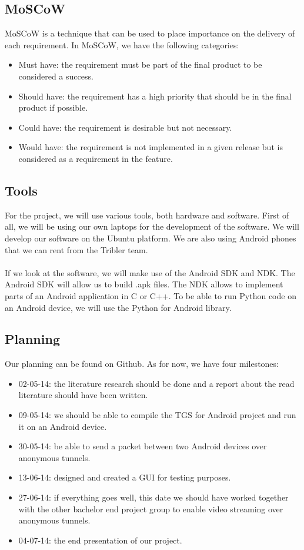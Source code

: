\documentclass{article}
\begin{document}
\subsection{MoSCoW}
MoSCoW is a technique that can be used to place importance on the delivery of each requirement. In MoSCoW, we have the following categories:
\begin{itemize}
\item Must have: the requirement must be part of the final product to be considered a success.
\item Should have: the requirement has a high priority that should be in the final product if possible.
\item Could have: the requirement is desirable but not necessary.
\item Would have: the requirement is not implemented in a given release but is considered as a requirement in the feature.
\end{itemize}

\subsection{Tools}
For the project, we will use various tools, both hardware and software. First of all, we will be using our own laptops for the development of the software. We will develop our software on the Ubuntu platform. We are also using Android phones that we can rent from the Tribler team.\\\\
If we look at the software, we will make use of the Android SDK and NDK. The Android SDK will allow us to build .apk files. The NDK allows to implement parts of an Android application in C or C++. To be able to run Python code on an Android device, we will use the Python for Android library.

\subsection{Planning}
Our planning can be found on Github. As for now, we have four milestones:
\begin{itemize}
\item 02-05-14: the literature research should be done and a report about the read literature should have been written.
\item 09-05-14: we should be able to compile the TGS for Android project and run it on an Android device.
\item 30-05-14: be able to send a packet between two Android devices over anonymous tunnels.
\item 13-06-14: designed and created a GUI for testing purposes.
\item 27-06-14: if everything goes well, this date we should have worked together with the other bachelor end project group to enable video streaming over anonymous tunnels.
\item 04-07-14: the end presentation of our project.
\end{itemize}
\end{document}

